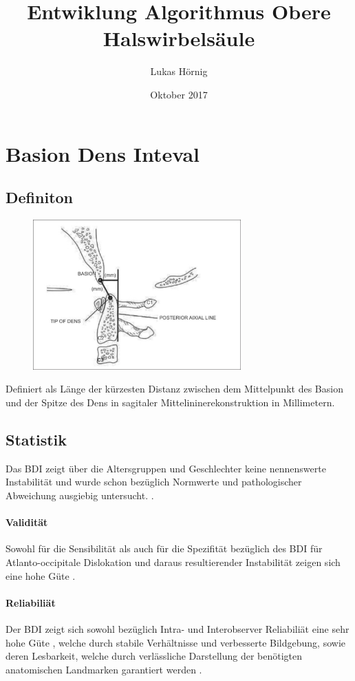 \documentclass{report}
\title{Entwiklung Algorithmus Obere Halswirbelsäule}
\author{Lukas Hörnig}
\date{Oktober 2017}
\begin{document}
\section{Basion Dens Inteval}
\subsection{Definiton}
\begin{figure}
        \includegraphics[width=8cm]{BDI.png}
\end{figure}
Definiert als Länge der kürzesten Distanz zwischen dem Mittelpunkt des Basion und der Spitze des Dens in sagitaler Mittelininerekonstruktion in Millimetern.


\subsection{Statistik}
Das BDI zeigt über die Altersgruppen und Geschlechter keine nennenswerte Instabilität \cite{Chaput2011} und wurde schon bezüglich Normwerte und pathologischer Abweichung ausgiebig untersucht.
\cite{Radcliff2010,Radcliff2012,Chang2009,Harris1994,Harris1994a,Chaput2011,Rojas2007,Gonzalez2004,Gonzalez2004a,Dziurzynski2005,Bono2007}. 



\paragraph{Validität}
Sowohl für die Sensibilität als auch für die Spezifität bezüglich des BDI für Atlanto-occipitale Dislokation und daraus resultierender Instabilität zeigen sich eine hohe Güte \cite{Dziurzynski2005}.

\paragraph{Reliabiliät}
Der BDI zeigt sich sowohl bezüglich Intra- und Interobserver Reliabiliät eine sehr hohe Güte \cite{Chaput2011,Dziurzynski2005,Harris1994,Harris1994a}, welche durch stabile Verhältnisse und verbesserte Bildgebung, sowie deren Lesbarkeit, welche durch verlässliche Darstellung der benötigten anatomischen Landmarken garantiert werden \cite{Dziurzynski2005,Radcliff2010}.
\end{document}
